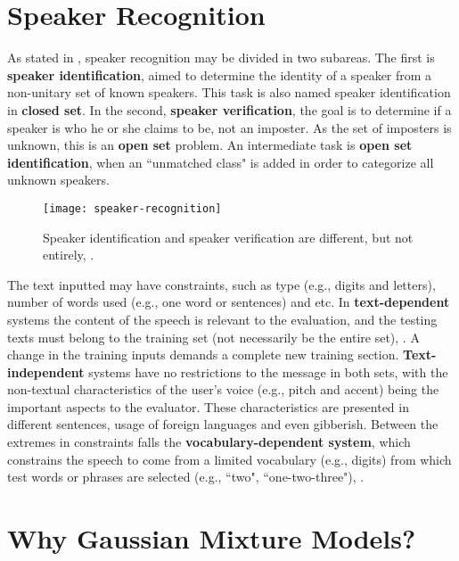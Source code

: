 \section{Speaker Recognition}
\label{sec:speaker-recognition}

As stated in , speaker recognition may be divided in two subareas. The first is \textbf{speaker identification}, aimed to determine the identity of a speaker from a non-unitary set of known speakers. This task is also named speaker identification in \textbf{closed set}. In the second, \textbf{speaker verification}, the goal is to determine if a speaker is who he or she claims to be, not an imposter. As the set of imposters is unknown, this is an \textbf{open set} problem. An intermediate task is \textbf{open set identification}, when an ``unmatched class" is added in order to categorize all unknown speakers.

\begin{figure}[ht]
    \centering
    \texttt{[image: speaker-recognition]}
    \caption{Speaker identification and speaker verification are different, but not entirely, .}
    \label{fig:speaker-recognition}
\end{figure}

The text inputted may have constraints, such as type (e.g., digits and letters), number of words used (e.g., one word or sentences) and etc. In \textbf{text-dependent} systems the content of the speech is relevant to the evaluation, and the testing texts must belong to the training set (not necessarily be the entire set), . A change in the training inputs demands a complete new training section. \textbf{Text-independent} systems have no restrictions to the message in both sets, with the non-textual characteristics of the user's voice (e.g., pitch and accent) being the important aspects to the evaluator. These characteristics are presented in different sentences, usage of foreign languages and even gibberish. Between the extremes in constraints falls the \textbf{vocabulary-dependent system}, which constrains the speech to come from a limited vocabulary (e.g., digits) from which test words or phrases are selected (e.g., ``two", ``one-two-three"), .

\section{Why Gaussian Mixture Models?}

